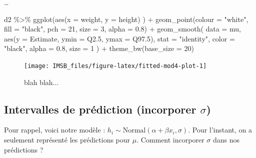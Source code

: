 \documentclass[
  a4paper,11pt,twoside,onecolumn,openright,final,oldfontcommands]{memoir}
\newenvironment{Shaded}{\begin{snugshade}}{\end{snugshade}}
\newcommand{\AttributeTok}[1]{\textcolor[rgb]{0.77,0.63,0.00}{#1}}
\newcommand{\DecValTok}[1]{\textcolor[rgb]{0.00,0.00,0.81}{#1}}
\newcommand{\FloatTok}[1]{\textcolor[rgb]{0.00,0.00,0.81}{#1}}
\newcommand{\FunctionTok}[1]{\textcolor[rgb]{0.00,0.00,0.00}{#1}}
\newcommand{\NormalTok}[1]{#1}
\newcommand{\SpecialCharTok}[1]{\textcolor[rgb]{0.00,0.00,0.00}{#1}}
\newcommand{\StringTok}[1]{\textcolor[rgb]{0.31,0.60,0.02}{#1}}
\theoremstyle{definition}
\theoremstyle{definition}
\theoremstyle{definition}
\theoremstyle{definition}
\theoremstyle{remark}
\begin{document}
\ldots{}

\begin{Shaded}
\begin{Highlighting}[]
\NormalTok{d2 }\SpecialCharTok{\%\textgreater{}\%}
  \FunctionTok{ggplot}\NormalTok{(}\FunctionTok{aes}\NormalTok{(}\AttributeTok{x =}\NormalTok{ weight, }\AttributeTok{y =}\NormalTok{ height) ) }\SpecialCharTok{+}
  \FunctionTok{geom\_point}\NormalTok{(}\AttributeTok{colour =} \StringTok{"white"}\NormalTok{, }\AttributeTok{fill =} \StringTok{"black"}\NormalTok{, }\AttributeTok{pch =} \DecValTok{21}\NormalTok{, }\AttributeTok{size =} \DecValTok{3}\NormalTok{, }\AttributeTok{alpha =} \FloatTok{0.8}\NormalTok{) }\SpecialCharTok{+}
  \FunctionTok{geom\_smooth}\NormalTok{(}
    \AttributeTok{data =}\NormalTok{ mu, }\FunctionTok{aes}\NormalTok{(}\AttributeTok{y =}\NormalTok{ Estimate, }\AttributeTok{ymin =}\NormalTok{ Q2}\FloatTok{.5}\NormalTok{, }\AttributeTok{ymax =}\NormalTok{ Q97}\FloatTok{.5}\NormalTok{),}
    \AttributeTok{stat =} \StringTok{"identity"}\NormalTok{,}
    \AttributeTok{color =} \StringTok{"black"}\NormalTok{, }\AttributeTok{alpha =} \FloatTok{0.8}\NormalTok{, }\AttributeTok{size =} \DecValTok{1}
\NormalTok{    ) }\SpecialCharTok{+}
  \FunctionTok{theme\_bw}\NormalTok{(}\AttributeTok{base\_size =} \DecValTok{20}\NormalTok{)}
\end{Highlighting}
\end{Shaded}

\begin{figure}[!htb]

{\centering \texttt{[image: IMSB\_files/figure-latex/fitted-mod4-plot-1]} 

}

\caption{blah blah...}\label{fig:fitted-mod4-plot}
\end{figure}

\hypertarget{intervalles-de-pruxe9diction-incorporer-sigma}{%
\subsection{\texorpdfstring{Intervalles de prédiction (incorporer \(\sigma\))}{Intervalles de prédiction (incorporer \textbackslash sigma)}}\label{intervalles-de-pruxe9diction-incorporer-sigma}}

Pour rappel, voici notre modèle : \(h_{i} \sim \mathrm{Normal}(\alpha + \beta x_{i}, \sigma)\). Pour l'instant, on a seulement représenté les prédictions pour \(\mu\). Comment incorporer \(\sigma\) dans nos prédictions ?
\end{document}
